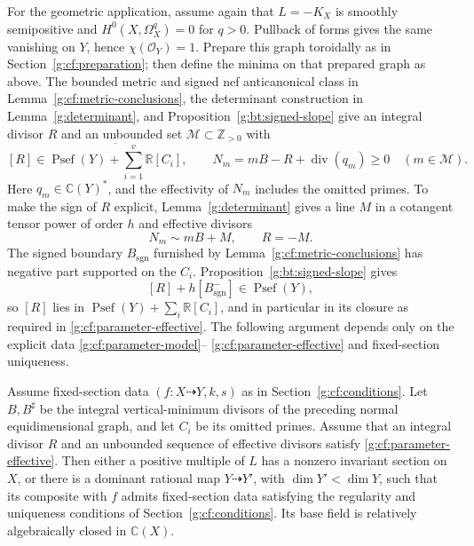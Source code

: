 For the geometric application, assume again that $L=-K_X$ is smoothly
semipositive and $H^0(X,\Omega_X^q)=0$ for $q>0$. Pullback of forms
gives the same vanishing on $Y$, hence $\chi(\mathcal O_Y)=1$.
Prepare this graph toroidally as in Section~\ref{g:cf:preparation};
then define the minima on that prepared graph as above. The bounded metric and signed nef anticanonical class in
Lemma~\ref{g:cf:metric-conclusions}, the determinant construction in Lemma~\ref{g:determinant}, and
Proposition~\ref{g:bt:signed-slope} give an integral divisor \(R\)
and an unbounded set \(\mathcal M\subset\mathbb Z_{>0}\) with
\begin{equation}\label{g:cf:parameter-effective}
 [R]\in\overline{\operatorname{Psef}(Y)
                     +\sum_{i=1}^v\mathbb R[C_i]},
 \qquad N_m=mB-R+\operatorname{div}(q_m)\geq0
 \quad(m\in\mathcal M).
\end{equation}
Here \(q_m\in\mathbb C(Y)^*\), and the effectivity of \(N_m\)
includes the omitted primes. To make the sign of \(R\) explicit,
Lemma~\ref{g:determinant} gives a line \(M\) in a cotangent tensor
power of order \(h\) and effective divisors
\[
 N_m\sim mB+M,\qquad R=-M.
\]
The signed boundary \(B_{\mathrm{sgn}}\) furnished by
Lemma~\ref{g:cf:metric-conclusions} has negative part supported
on the \(C_i\). Proposition~\ref{g:bt:signed-slope} gives
\[
 [R]+h[B_{\mathrm{sgn}}^-]\in\operatorname{Psef}(Y),
\]
so \([R]\) lies in
\(\operatorname{Psef}(Y)+\sum_i\mathbb R[C_i]\), and in particular
in its closure as required in \eqref{g:cf:parameter-effective}.
The following argument depends only on
the explicit data \eqref{g:cf:parameter-model}--
\eqref{g:cf:parameter-effective} and fixed-section uniqueness.

\begin{proposition}\label{g:cf:parameter-contraction}
Assume fixed-section data $(f:X\dashrightarrow Y,k,s)$ as in
Section~\ref{g:cf:conditions}. Let $B,B^\sharp$ be the integral
vertical-minimum divisors of the preceding normal equidimensional graph,
and let $C_i$ be its omitted primes. Assume that an integral divisor $R$
and an unbounded sequence of effective divisors satisfy
\eqref{g:cf:parameter-effective}.
Then either a positive multiple of \(L\) has a
nonzero invariant section on \(X\), or there is a dominant rational
map \(Y\dashrightarrow Y'\), with \(\dim Y'<\dim Y\), such that
its composite with \(f\) admits fixed-section data satisfying
the regularity and uniqueness conditions of
Section~\ref{g:cf:conditions}.  Its base field is relatively
algebraically closed in \(\mathbb C(X)\).
\end{proposition}

